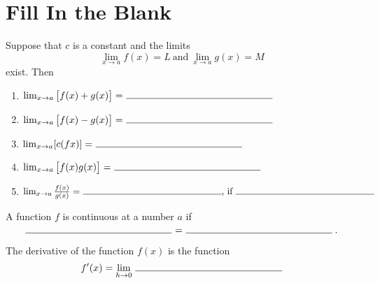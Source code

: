\documentclass[12pt]{amsart}
\begin{document}
\newpage
\section*{Fill In the Blank}

\begin{thm}
  Suppose that \(c\) is a constant and the limits
  \[\lim_{x \to a} f(x) = L\ \text{and}\ \lim_{x \to a} g(x) = M\]
  exist.
  Then
    \begin{enumerate}
    \item
      \(\lim_{x \to a} \left[f(x) + g(x)\right] =\ \line(1,0){150}\)
      \vspace{.25in}
    \item
      \(\lim_{x \to a} \left[f(x) - g(x)\right] =\ \line(1,0){150}\)
      \vspace{.25in}
    \item
      \(\lim_{x \to a} [c(fx)] =\ \line(1,0){150}\)
      \vspace{.25in}
    \item
      \(\lim_{x \to a} \left[f(x)g(x)\right] =\ \line(1,0){150}\)
      \vspace{.25in}
    \item
      \(\lim_{x \to a} \frac{f(x)}{g(x)} =\ \line(1,0){150},\, \text{if}\ \line(1,0){150}\)
      \vspace{.25in}
    \end{enumerate}
\end{thm}

\begin{thm}[2 Points]
  A function \(f\) is continuous at a number \(a\) if
  \vspace{.15in}
  \[\line(1,0){150}\ =\ \line(1,0){150}.\]
\end{thm}

\begin{thm}[1 Point]
  The derivative of the function \(f(x)\) is the function
  \vspace{.25in}
  \[f^\prime(x) = \lim_{h \to 0}\ \line(1,0){150}\]
\end{thm}
\end{document}
